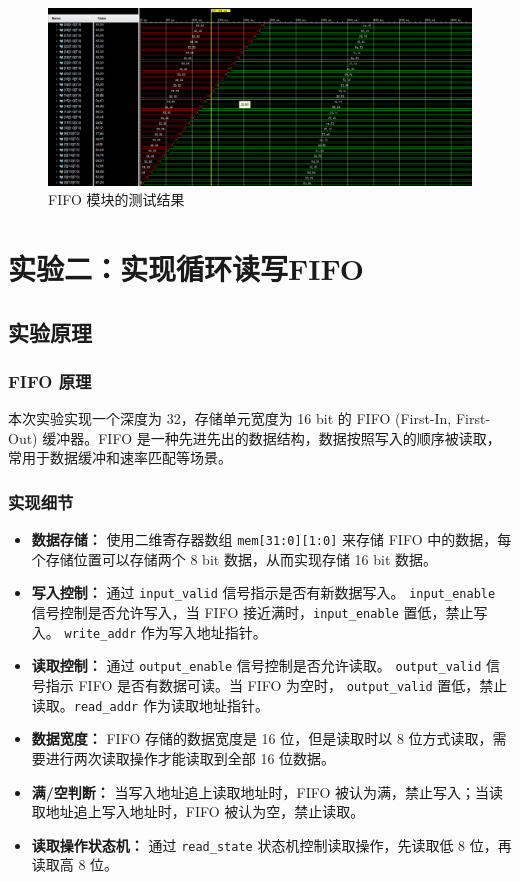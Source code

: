 \documentclass[zihao=5, UTF8]{article}
\theoremstyle{MyLineTheoremStyle} %
\theoremstyle{MyBlockTheoremStyle} %
\theoremstyle{MySubsubsectionStyle} %
\begin{document}
\begin{figure}[H]
    \centering
    \includegraphics[width=\textwidth]{fifo_test_task1.png} %
    \caption{FIFO 模块的测试结果}
    \label{fig:fifo模块的测试结果}
\end{figure}

\section{实验二：实现循环读写FIFO}
\subsection{实验原理}
\subsubsection{FIFO 原理}
本次实验实现一个深度为 32，存储单元宽度为 16 bit 的 FIFO (First-In, First-Out) 缓冲器。FIFO 是一种先进先出的数据结构，数据按照写入的顺序被读取，常用于数据缓冲和速率匹配等场景。

\subsubsection{实现细节}
\begin{itemize}
    \item \textbf{数据存储：} 使用二维寄存器数组 \texttt{mem[31:0][1:0]} 来存储 FIFO 中的数据，每个存储位置可以存储两个 8 bit 数据，从而实现存储 16 bit 数据。
    \item \textbf{写入控制：} 通过 \texttt{input\_valid} 信号指示是否有新数据写入。 \texttt{input\_enable} 信号控制是否允许写入，当 FIFO 接近满时，\texttt{input\_enable} 置低，禁止写入。 \texttt{write\_addr} 作为写入地址指针。
    \item \textbf{读取控制：} 通过 \texttt{output\_enable} 信号控制是否允许读取。 \texttt{output\_valid} 信号指示 FIFO 是否有数据可读。当 FIFO 为空时， \texttt{output\_valid} 置低，禁止读取。\texttt{read\_addr} 作为读取地址指针。
    \item \textbf{数据宽度：} FIFO 存储的数据宽度是 16 位，但是读取时以 8 位方式读取，需要进行两次读取操作才能读取到全部 16 位数据。
    \item \textbf{满/空判断：} 当写入地址追上读取地址时，FIFO 被认为满，禁止写入；当读取地址追上写入地址时，FIFO 被认为空，禁止读取。
    \item \textbf{读取操作状态机：} 通过 \texttt{read\_state} 状态机控制读取操作，先读取低 8 位，再读取高 8 位。
\end{itemize}
\end{document}
